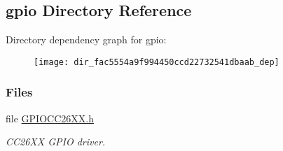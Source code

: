 \subsection{gpio Directory Reference}
\label{dir_fac5554a9f994450ccd22732541dbaab}
Directory dependency graph for gpio\+:
\nopagebreak
\begin{figure}[H]
\begin{center}
\leavevmode
\texttt{[image: dir\_fac5554a9f994450ccd22732541dbaab\_dep]}
\end{center}
\end{figure}
\subsubsection*{Files}
\begin{DoxyCompactItemize}
\item 
file \hyperlink{_g_p_i_o_c_c26_x_x_8h}{G\+P\+I\+O\+C\+C26\+X\+X.\+h}
\begin{DoxyCompactList}\small\item\em C\+C26\+X\+X G\+P\+I\+O driver. \end{DoxyCompactList}\end{DoxyCompactItemize}
